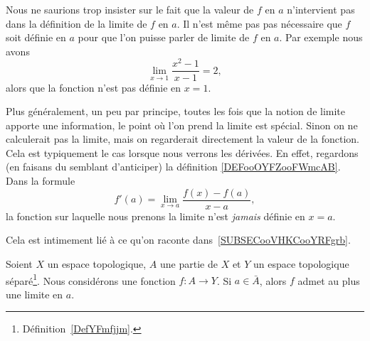 \begin{remark}
    Nous ne saurions trop insister sur le fait que la valeur de \( f\) en \( a\) n'intervient pas dans la définition de la limite de \( f\) en \( a\). Il n'est même pas pas nécessaire que \( f\) soit définie en \( a\) pour que l'on puisse parler de limite de \( f\) en \( a\). Par exemple nous avons
    \begin{equation}
        \lim_{x\to 1} \frac{ x^2-1 }{ x-1 }=2,
    \end{equation}
    alors que la fonction n'est pas définie en \( x=1\).

    Plus généralement, un peu par principe, toutes les fois que la notion de limite apporte une information, le point où l'on prend la limite est spécial. Sinon on ne calculerait pas la limite, mais on regarderait directement la valeur de la fonction. Cela est typiquement le cas lorsque nous verrons les dérivées. En effet, regardons (en faisans du semblant d'anticiper) la définition  \eqref{DEFooOYFZooFWmcAB}. Dans la formule
    \begin{equation}
        f'(a)=\lim_{x\to a} \frac{ f(x)-f(a) }{ x-a },
    \end{equation}
    la fonction sur laquelle nous prenons la limite n'est \emph{jamais} définie en \( x=a\).

    Cela est intimement lié à ce qu'on raconte dans~\ref{SUBSECooVHKCooYRFgrb}.
\end{remark}

\begin{proposition}\label{PropFObayrf}
    Soient \( X\) un espace topologique, \( A\) une partie de \( X\) et \( Y\) un espace topologique séparé\footnote{Définition~\ref{DefYFmfjjm}.}. Nous considérons une fonction \( f\colon A\to Y\). Si \( a\in\bar A\), alors \( f\) admet au plus une limite en \( a\).
\end{proposition}

